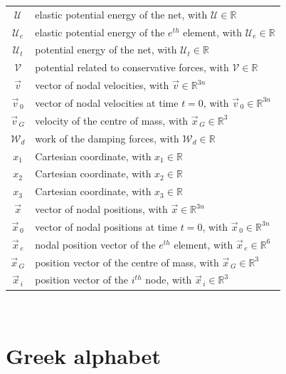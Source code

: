 \pagebreak

\begin{tabular}{cp{}}
  $ \mathcal{U} $ & elastic potential energy of the net, with $\mathcal{U} \in \mathbb{R}$ \\
  $ \mathcal{U}_{e} $ & elastic potential energy of the $e^{th}$ element, with $\mathcal{U}_e \in \mathbb{R}$ \\
  $ \mathcal{U}_t $ & potential energy of the net, with $\mathcal{U}_t \in \mathbb{R}$ \\
  $ \mathcal{V} $ & potential related to conservative forces, with $\mathcal{V} \in \mathbb{R}$ \\
  $\vec{v}$ & vector of nodal velocities, with $ \vec{v} \in \mathbb{R}^{3n}$ \\
  $\vec{v}_{\,0}$ & vector of nodal velocities at time $ t = 0$, with $ \vec{v}_{\,0} \in \mathbb{R}^{3n}$ \\
  $\vec{v}_{\,G}$ & velocity of the centre of mass, with $ \vec{x}_{\,G} \in \mathbb{R}^3$ \\
  $ \mathcal{W}_d $ & work of the damping forces, with $\mathcal{W}_d \in \mathbb{R}$ \\
  $x_1$ & Cartesian coordinate, with $x_1 \in \mathbb{R}$ \\
  $x_2$ & Cartesian coordinate, with $x_2 \in \mathbb{R}$ \\
  $x_3$ & Cartesian coordinate, with $x_3 \in \mathbb{R}$ \\
  $\vec{x}$ & vector of nodal positions, with $ \vec{x} \in \mathbb{R}^{3n}$ \\
  $\vec{x}_{\,0}$ & vector of nodal positions at time $ t = 0$, with $ \vec{x}_{\,0} \in \mathbb{R}^{3n}$ \\
  $\vec{x}_{\,e}$ & nodal position vector of the $e^{th}$ element, with $ \vec{x}_{\,e} \in \mathbb{R}^6$ \\
  $\vec{x}_{\,G}$ & position vector of the centre of mass, with $ \vec{x}_{\,G} \in \mathbb{R}^3$ \\
  $\vec{x}_{\,i}$ & position vector of the $i^{th}$ node, with $ \vec{x}_{\,i} \in \mathbb{R}^3$\\
\end{tabular}\\

\section*{Greek alphabet}

